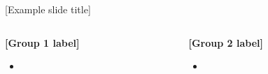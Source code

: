 \documentclass[t,pdf,aspectratio=169]{beamer}
\newcommand{\ph}[1]{[#1]}
\newcommand{\backupend}{
   \setcounter{framenumber}{\value{finalframe}}
}
\begin{document}
\begin{frame}{\ph{Example slide title}}
  \begin{columns}[t]
    \begin{column}{0.48\textwidth}
      \textbf{\ph{Group 1 label}}
      \begin{itemize}
        \item \ph{Example text from group 1.}
      \end{itemize}
    \end{column}
    \begin{column}{0.48\textwidth}
      \textbf{\ph{Group 2 label}}
      \begin{itemize}
        \item \ph{Example text from group 2.}
      \end{itemize}
    \end{column}
  \end{columns}
\end{frame}

\backupend
\end{document}
